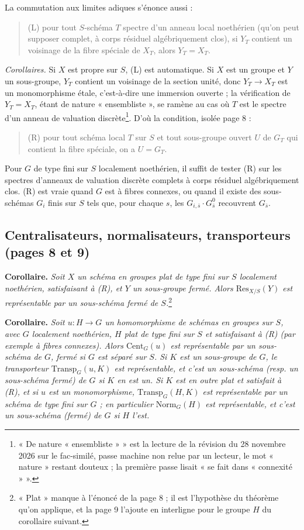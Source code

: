 \documentclass[11pt,a4paper]{article}
\begin{document}
La commutation aux limites adiques s'énonce aussi :

\begin{quote}
(L) pour tout $S$-schéma $T$ spectre d'un anneau local noethérien (qu'on peut
supposer complet, à corps résiduel algébriquement clos), si $Y_T$ contient
un voisinage de la fibre spéciale de $X_T$, alors $Y_T = X_T$.
\end{quote}

\emph{Corollaires.} Si $X$ est propre sur $S$, (L) est automatique. Si $X$ est
un groupe et $Y$ un sous-groupe, $Y_T$ contient un voisinage de la section
unité, donc $Y_T \to X_T$ est un monomorphisme étale, c'est-à-dire une
immersion ouverte ; la vérification de $Y_T = X_T$, étant de nature
« ensembliste », se ramène au cas où $T$ est le spectre d'un anneau de
valuation discrète\footnote{« De nature « ensembliste » » est la lecture de la
révision du 28 novembre 2026 sur le fac-similé, passe machine non relue par un lecteur, le mot « nature » restant douteux ; la première passe lisait « se
fait dans « connexité » ».}.
D'où la condition, isolée page 8 :

\begin{quote}
(R) pour tout schéma local $T$ sur $S$ et tout sous-groupe ouvert $U$ de
$G_T$ qui contient la fibre spéciale, on a $U = G_T$.
\end{quote}

Pour $G$ de type fini sur $S$ localement noethérien, il suffit de tester (R)
sur les spectres d'anneaux de valuation discrète complets à corps résiduel
algébriquement clos. (R) est vraie quand $G$ est à fibres connexes, ou
quand il existe des sous-schémas $G_i$ finis sur $S$ tels que, pour chaque
$s$, les $G_{i,\bar s} \cdot G^{0}_{\bar s}$ recouvrent $G_{\bar s}$.

\subsection*{Centralisateurs, normalisateurs, transporteurs (pages 8 et 9)}

\textbf{Corollaire.} \emph{Soit $X$ un schéma en groupes plat de type fini sur
$S$ localement noethérien, satisfaisant à (R), et $Y$ un sous-groupe fermé.
Alors $\mathrm{Res}_{X/S}(Y)$ est représentable par un sous-schéma fermé de
$S$.}\footnote{« Plat » manque à l'énoncé de la page 8 ; il est l'hypothèse
du théorème qu'on applique, et la page 9 l'ajoute en interligne pour le
groupe $H$ du corollaire suivant.}

\textbf{Corollaire.} \emph{Soit $u : H \to G$ un homomorphisme de schémas en
groupes sur $S$, avec $G$ localement noethérien, $H$ plat de type fini sur $S$
et satisfaisant à (R) (par exemple à fibres connexes). Alors
$\mathrm{Cent}_G(u)$ est représentable par un sous-schéma de $G$, fermé si $G$
est séparé sur $S$. Si $K$ est un sous-groupe de $G$, le transporteur
$\mathrm{Transp}_G(u, K)$ est représentable, et c'est un sous-schéma (resp.
un sous-schéma fermé) de $G$ si $K$ en est un. Si $K$ est en outre plat et
satisfait à (R), et si $u$ est un monomorphisme, $\mathrm{Transp}_G(H,K)$
est représentable par un schéma de type fini sur $G$ ; en particulier
$\mathrm{Norm}_G(H)$ est représentable, et c'est un sous-schéma (fermé) de $G$
si $H$ l'est.}
\end{document}

